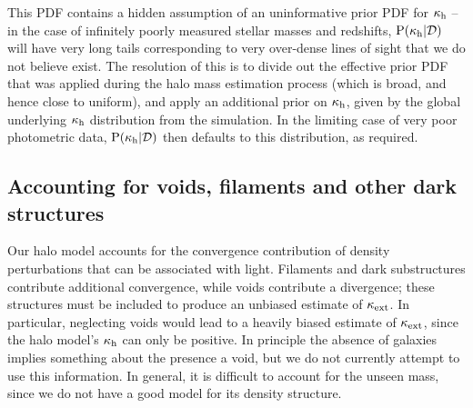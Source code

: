 \documentclass[useAMS,usenatbib,a4paper]{mn2e}
\begin{document}
This PDF contains a hidden assumption of an uninformative prior PDF for
$\kappa_{\rm h}$ -- in the case of infinitely poorly measured stellar masses and
redshifts, ${\rm P}(\kappa_{\rm h}|{\mathcal{D}})$ will have very long tails corresponding to
very over-dense lines of sight that we do not believe exist. The resolution of this
is to divide out the effective prior PDF that was applied during the halo mass
estimation process (which is broad, and hence close to uniform), and apply an
additional prior on $\kappa_{\rm h}$, given by the global underlying $\kappa_{\rm h}$
distribution from the simulation. In the limiting  case of very poor
photometric data, ${\rm P}(\kappa_{\rm h}|{\mathcal{D}})$ then defaults to this distribution, as
required.





\subsection{Accounting for voids, filaments and other dark structures}
\label{sec:model:voids}

Our halo model accounts for the convergence contribution of density
perturbations that can be associated with light. Filaments and dark
substructures contribute additional convergence, while voids contribute a
divergence; these structures must be included to produce an unbiased estimate
of $\kappa_{\rm ext}$. In particular, neglecting voids would lead to a heavily biased
estimate of $\kappa_{\rm ext}$, since the halo model's $\kappa_{\rm h}$ can only be positive.
In principle the absence of galaxies implies something about the presence a
void, but we do not currently attempt to use this information. In general, it
is difficult to account for the unseen mass, since we do not have a good model
for its density structure.
\end{document}
